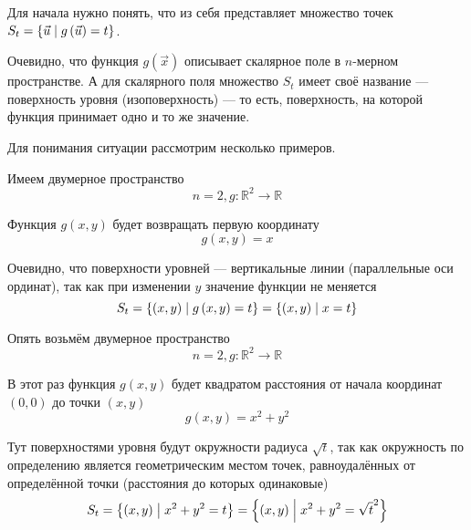 Для начала нужно понять, что из себя представляет множество точек
$S_t = \left\{ \vec{u} \;\middle|\; g\left( \vec{u} \right) = t \right\}$.

Очевидно, что функция $g\left( \vec{x} \right)$
описывает скалярное поле в $n$-мерном пространстве.
А для скалярного поля множество $S_t$
имеет своё название --- поверхность уровня (изоповерхность) --- то есть,
поверхность, на которой функция принимает одно и то же значение.

Для понимания ситуации рассмотрим несколько примеров.

\begin{example}
    Имеем двумерное пространство
    $$n=2, g: \mathbb{R}^2 \rightarrow \mathbb{R}$$

    Функция $g\left( x, y \right)$ будет возвращать первую координату
    $$g\left( x, y \right) = x$$

    Очевидно, что поверхности уровней --- вертикальные линии
    (параллельные оси ординат), так как при изменении $y$
    значение функции не меняется
    $$S_t
        = \left\{ \left( x, y \right) \;\middle|\; g\left( x, y \right) = t \right\}
        = \left\{ \left( x, y \right) \;\middle|\; x = t \right\}$$
\end{example}

\begin{example}
    Опять возьмём двумерное пространство
    $$n=2, g: \mathbb{R}^2 \rightarrow \mathbb{R}$$

    В этот раз функция $g\left( x, y \right)$ будет квадратом расстояния
    от начала координат $\left( 0, 0 \right)$ до точки $\left( x, y \right)$
    $$g\left( x, y \right) = x^2 + y^2$$

    Тут поверхностями уровня будут окружности радиуса $\sqrt{t}$,
    так как окружность по определению является геометрическим местом точек,
    равноудалённых от определённой точки (расстояния до которых одинаковые)
    $$S_t
        = \left\{ \left( x, y \right) \;\middle|\; x^2 + y^2 = t \right\}
        = \left\{ \left( x, y \right) \;\middle|\; x^2 + y^2 = \sqrt{t}^2 \right\}$$
\end{example}

